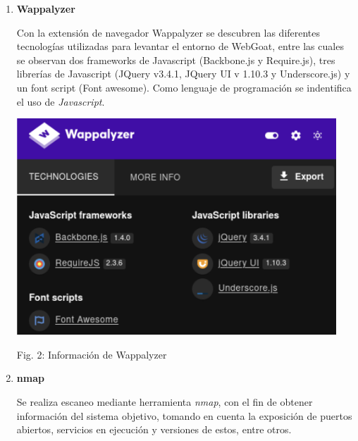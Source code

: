 \documentclass[12pt,oneside,a4paper]{book}
\begin{document}
\begin{enumerate}
\begin{enumerate}
            \item \textbf{Wappalyzer}
            
            \vspace{1em}
            
            \hspace{20pt}
            Con la extensión de navegador Wappalyzer se descubren las diferentes tecnologías utilizadas para levantar el entorno de WebGoat, entre las cuales se observan dos frameworks de Javascript (Backbone.js y Require.js), tres librerías de Javascript (JQuery v3.4.1, JQuery UI v 1.10.3 y Underscore.js) y un font script (Font awesome). Como lenguaje de programación se indentifica el uso de \textit{Javascript}.
            
            \vspace{2em}
            
            \begin{center}
                \includegraphics[width=12cm]{img/wappalyzer.png}
                \vspace{0.1em}
            
                Fig. 2: Información de Wappalyzer
            \end{center}
            
            \vspace{2em}
    
            \item \textbf{nmap}
            
            \vspace{1em}
            
            \newline
            \hspace{20pt}
            Se realiza escaneo mediante herramienta \textit{nmap}, con el fin de obtener información del sistema objetivo, tomando en cuenta la exposición de puertos abiertos, servicios en ejecución y versiones de estos, entre otros. 
            

\end{enumerate}
\end{enumerate}
\end{document}
